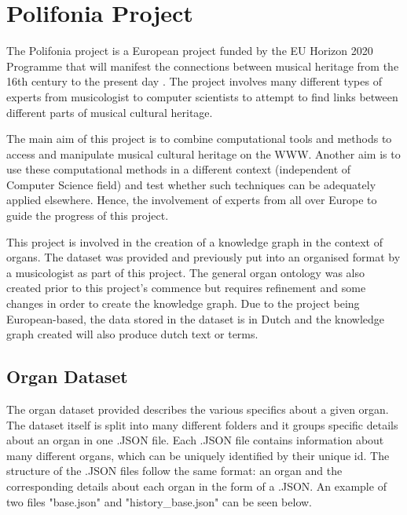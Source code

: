\section{Polifonia Project}
\hspace{0.5cm} The Polifonia project is a European project funded by the EU Horizon 2020 Programme that will manifest the connections between musical heritage from the 16th century to the present day \cite{polifonia}. The project involves many different types of experts from musicologist to computer scientists to attempt to find links between different parts of musical cultural heritage. 

The main aim of this project is to combine computational tools and methods to access and manipulate musical cultural heritage on the WWW. Another aim is to use these computational methods in a different context (independent of Computer Science field) and test whether such techniques can be adequately applied elsewhere. Hence, the involvement of experts from all over Europe to guide the progress of this project. \cite{polifoniaproject}

This project is involved in the creation of a knowledge graph in the context of organs. The dataset was provided and previously put into an organised format by a musicologist as part of this project. The general organ ontology was also created prior to this project's commence but requires refinement and some changes in order to create the knowledge graph. Due to the project being European-based, the data stored in the dataset is in Dutch and the knowledge graph created will also produce dutch text or terms.  

\subsection{Organ Dataset}
\hspace{0.5cm} The organ dataset provided describes the various specifics about a given organ. The dataset itself is split into many different folders and it groups specific details about an organ in one .JSON file. Each .JSON file contains information about many different organs, which can be uniquely identified by their unique id. The structure of the .JSON files follow the same format: an organ and the corresponding details about each organ in the form of a .JSON. An example of two files "base.json" and "history\_base.json" can be seen below. 

